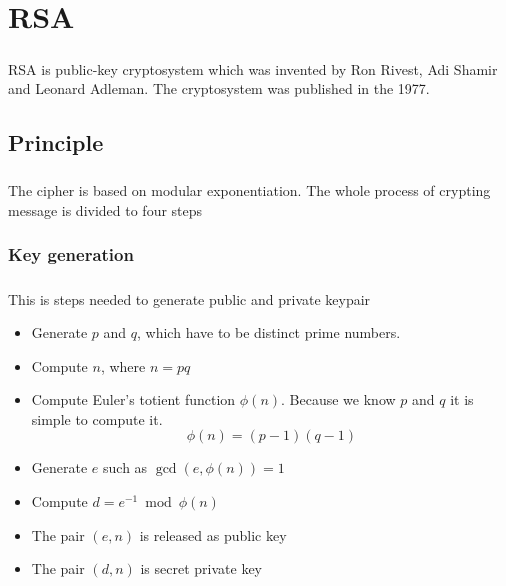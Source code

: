 \documentclass[thesis=B,english]{FITthesis}[2012/10/20]
\begin{document}
{\paragraph*{}{
}
\paragraph*{}{
}


\chapter{RSA}

\paragraph*{}
{RSA is public-key cryptosystem which was invented by Ron Rivest, Adi Shamir and Leonard Adleman. The cryptosystem was published in the 1977.}


\section{Principle}
\paragraph*{}
{The cipher is based on modular exponentiation. The whole process of crypting message is divided to four steps}

\subsection{Key generation}
\paragraph*{}
{This is steps needed to generate public and private keypair}
\begin{itemize}
 \item Generate \(p\) and \(q\), which have to be distinct prime numbers.
 \item Compute \(n\), where \(n = p  q\)
 \item Compute Euler's totient function \(\phi(n)\). Because we know \(p\) and \(q\) it is simple to compute it. \[\phi(n) = (p - 1)(q - 1)\]
 \item Generate \(e\) such as \(\gcd(e,\phi(n)) = 1\) 
 \item Compute \(d = e^{-1}\bmod{\phi(n)} \)
 \item The pair \((e,n)\) is released as public key
 \item The pair \((d,n)\) is secret private key
\end{itemize}

}
\end{document}
